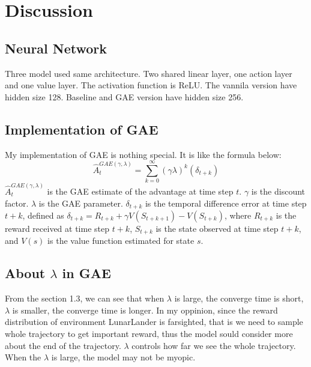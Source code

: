 \documentclass{article} %
\begin{document}
    \section{Discussion}
    \subsection{Neural Network}
    Three model used same architecture. 
    Two shared linear layer, one action layer and one value layer. 
    The activation function is ReLU. 
    The vannila version have hidden size 128. 
    Baseline and GAE version have hidden size 256.
    \subsection{Implementation of GAE}
    My implementation of GAE is nothing special. It is like the formula below:
    $$
    \hat{A}_t^{GAE(\gamma,\lambda)} = \sum_{k=0}^{\infty}{(\gamma \lambda)^k(\delta_{t+k})}
    $$
    $\hat{A}_t^{GAE(\gamma,\lambda)}$ is the GAE estimate of the advantage at time step $t$.
    $\gamma$ is the discount factor.
    $\lambda$ is the GAE parameter.
    $\delta_{t+k}$ is the temporal difference error at time step $t+k$, defined as $\delta_{t+k} = R_{t+k} + \gamma V(S_{t+k+1}) - V(S_{t+k})$, where $R_{t+k}$ is the reward received at time step $t+k$, $S_{t+k}$ is the state observed at time step $t+k$, and $V(s)$ is the value function estimated for state $s$.
    \subsection{About $\lambda$ in GAE}
    From the section 1.3, we can see that when $\lambda$ is large, the converge time is short, $\lambda$ is smaller, the converge time is longer.
    In my oppinion, since the reward distribution of environment LunarLander is farsighted, that is we need to sample whole trajectory to get important reward, thus the model sould consider more about the end of the trajectory.
    $\lambda$ controls how far we see the whole trajectory. When the $\lambda$ is large, the model may not be myopic.
\end{document}
